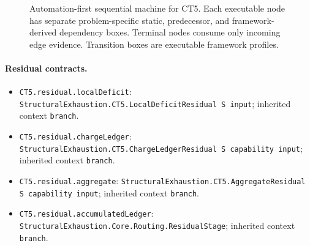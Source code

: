 \begin{landscape}
\begin{figure}[p]
\begin{adjustbox}{max totalsize={\linewidth}{0.72\textheight},center}
\begin{tikzpicture}[x=1cm,y=1cm]
\end{tikzpicture}%
\end{adjustbox}
\caption{Automation-first sequential machine for CT5. Each executable node has separate problem-specific static, predecessor, and framework-derived dependency boxes. Terminal nodes consume only incoming edge evidence. Transition boxes are executable framework profiles.}
\label{fig:ct5-machine}
\end{figure}
\end{landscape}

\begingroup\small\sloppy
\paragraph{Residual contracts.}
\begin{itemize}
\item \texttt{CT5.\allowbreak{}residual.\allowbreak{}local\allowbreak{}Deficit}: \texttt{Structural\allowbreak{}Exhaustion.\allowbreak{}CT5.\allowbreak{}Local\allowbreak{}Deficit\allowbreak{}Residual S input}; inherited context \texttt{branch}.
\item \texttt{CT5.\allowbreak{}residual.\allowbreak{}charge\allowbreak{}Ledger}: \texttt{Structural\allowbreak{}Exhaustion.\allowbreak{}CT5.\allowbreak{}Charge\allowbreak{}Ledger\allowbreak{}Residual S capability input}; inherited context \texttt{branch}.
\item \texttt{CT5.\allowbreak{}residual.\allowbreak{}aggregate}: \texttt{Structural\allowbreak{}Exhaustion.\allowbreak{}CT5.\allowbreak{}Aggregate\allowbreak{}Residual S capability input}; inherited context \texttt{branch}.
\item \texttt{CT5.\allowbreak{}residual.\allowbreak{}accumulated\allowbreak{}Ledger}: \texttt{Structural\allowbreak{}Exhaustion.\allowbreak{}Core.\allowbreak{}Routing.\allowbreak{}Residual\allowbreak{}Stage}; inherited context \texttt{branch}.
\end{itemize}
